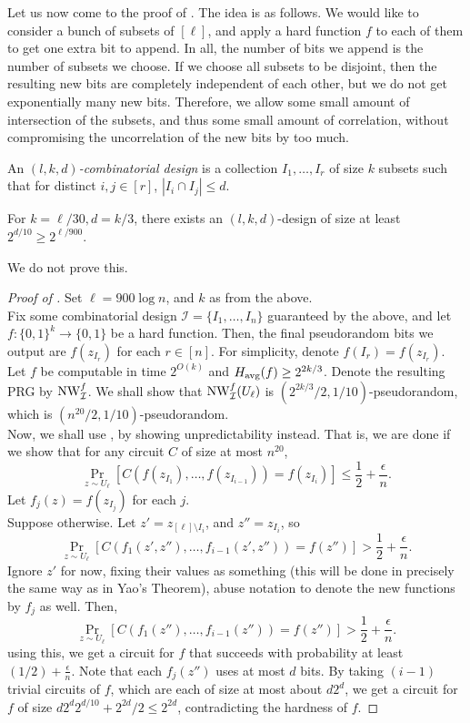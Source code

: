 		Let us now come to the proof of . The idea is as follows. We would like to consider a bunch of subsets of $[\ell]$, and apply a hard function $f$ to each of them to get one extra bit to append. In all, the number of bits we append is the number of subsets we choose. If we choose all subsets to be disjoint, then the resulting new bits are completely independent of each other, but we do not get exponentially many new bits. Therefore, we allow some small amount of intersection of the subsets, and thus some small amount of correlation, without compromising the uncorrelation of the new bits by too much.

		\begin{fdef}
			An \emph{$(l,k,d)$-combinatorial design} is a collection $I_1,\ldots,I_r$ of size $k$ subsets such that for distinct $i,j \in [r]$, $|I_i \cap I_j| \le d$.
		\end{fdef}

		\begin{fprop}
			For $k=\ell/30, d=k/3$, there exists an $(l,k,d)$-design of size at least $2^{d/10} \ge 2^{\ell/900}$.
		\end{fprop}
		We do not prove this.

		\begin{proof}[Proof of ]
			Set $\ell = 900 \log n$, and $k$ as from the above.\\
			Fix some combinatorial design $\mathcal{I} = \{I_1,\ldots,I_n\}$ guaranteed by the above, and let $f : \{0,1\}^k \to \{0,1\}$ be a hard function. Then, the final pseudorandom bits we output are $f(z_{I_r})$ for each $r \in [n]$. For simplicity, denote $f(I_r) = f(z_{I_r})$. \\
			Let $f$ be computable in time $2^{O(k)}$ and $H_{\text{avg}}(f) \ge 2^{2k/3}$. Denote the resulting PRG by $\operatorname{NW}_{\mathcal{I}}^f$. We shall show that $\operatorname{NW}_{\mathcal{I}}^f(U_\ell)$ is $(2^{2k/3}/2 , 1/10)$-pseudorandom, which is $(n^{20}/2, 1/10)$-pseudorandom. \\
			Now, we shall use , by showing unpredictability instead. That is, we are done if we show that for any circuit $C$ of size at most $n^{20}$,
			\[ \Pr_{z \sim U_\ell}\left[ C(f(z_{I_1}),\ldots,f(z_{I_{i-1}})) = f(z_{I_i}) \right] \le \frac{1}{2} + \frac{\epsilon}{n}. \]
			Let $f_j(z) = f(z_{I_j})$ for each $j$.\\
			Suppose otherwise. Let $z' = z_{[\ell] \setminus I_i}$, and $z'' = z_{I_i}$, so
			\[ \Pr_{z \sim U_\ell}\left[ C(f_1(z',z''),\ldots,f_{i-1}(z',z'')) = f(z'') \right] > \frac{1}{2} + \frac{\epsilon}{n}. \]
			Ignore $z'$ for now, fixing their values as something (this will be done in precisely the same way as in Yao's Theorem), abuse notation to denote the new functions by $f_j$ as well. Then,
			\[ \Pr_{z \sim U_\ell}\left[ C(f_1(z''),\ldots,f_{i-1}(z'')) = f(z'') \right] > \frac{1}{2} + \frac{\epsilon}{n}. \]
			using this, we get a circuit for $f$ that succeeds with probability at least $(1/2)+\frac{\epsilon}{n}$. Note that each $f_{j}(z'')$ uses at most $d$ bits. By taking $(i-1)$ trivial circuits of $f$, which are each of size at most about $d 2^d$, we get a circuit for $f$ of size $d 2^d 2^{d/10} + 2^{2d}/2 \le 2^{2d}$, contradicting the hardness of $f$.
		\end{proof}